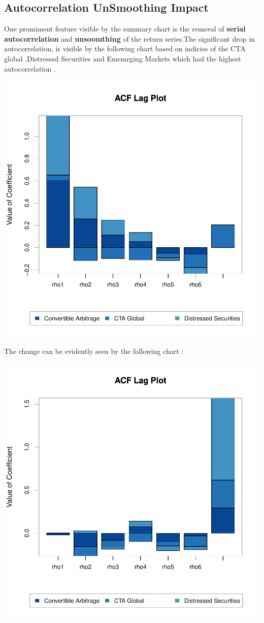 \documentclass[12pt,letterpaper,english]{article}
\begin{document}
\subsection{Autocorrelation UnSmoothing Impact}
One promiment feature visible by the summary chart is the removal of \textbf{serial autocorrelation} and \textbf{unsoomthing} of the return series.The significant drop in autocorrelation, is visible by the following chart based on  indicies of the CTA global ,Distressed Securities and Ememrging Markets which had the highest autocorrelation .

\includegraphics{OWReturn-005}

The change can be evidently seen by the following chart :


\includegraphics{OWReturn-006}
\end{document}
